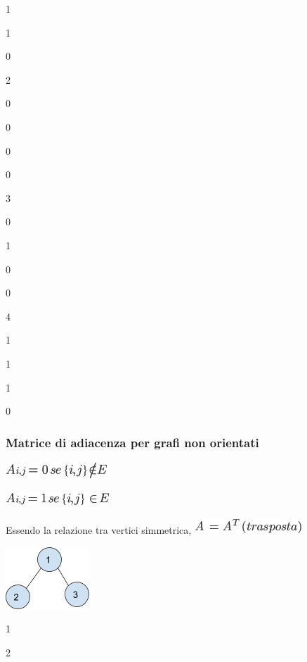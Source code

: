 \documentclass{article}
\begin{document}
{1}

{1}

{0}

{2}

{0}

{0}

{0}

{0}

{3}

{0}

{1}

{0}

{0}

{4}

{1}

{1}

{1}

{0}

{}

\hypertarget{h.iuwxcos21awu}{\subsubsection{\texorpdfstring{{Matrice di
adiacenza per grafi non
orientati}}{Matrice di adiacenza per grafi non orientati}}\label{h.iuwxcos21awu}}

\includegraphics{images/image388.png}

\includegraphics{images/image389.png}

{Essendo la relazione tra vertici simmetrica,
}\includegraphics{images/image390.png}

{}

{}

\protect\hypertarget{t.1db15af38187ce98dc87977567f42b70be1e9c99}{}{}\protect\hypertarget{t.38}{}{}

{\includegraphics{images/image535.png}}

{}

{1}

{2}
\end{document}
